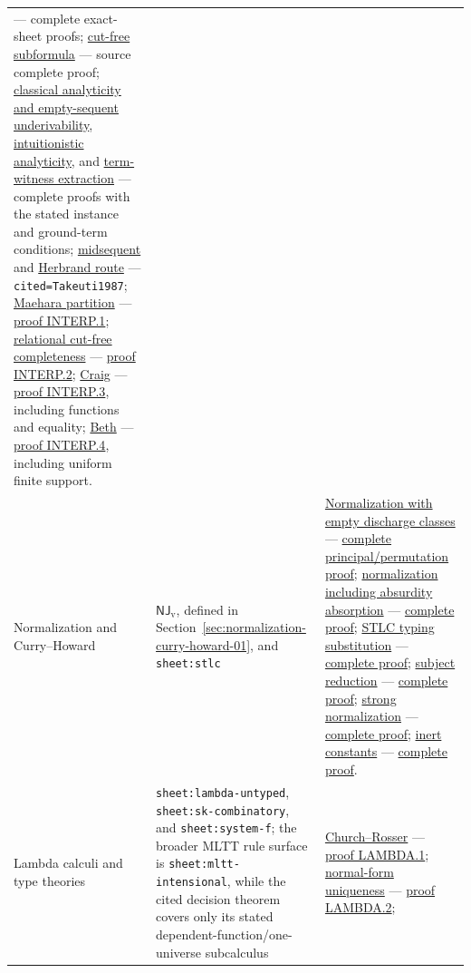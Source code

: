 \begin{landscape}
\begin{longtable}{@{}p{.82in}p{2.05in}p{4.95in}@{}}
--- complete exact-sheet proofs;
\hyperref[lem:cutfree-subformula]{cut-free subformula}
--- source complete proof;
\hyperref[thm:p07-classical-analytic]{classical analyticity and empty-sequent underivability},
\hyperref[thm:p07-lj-analyticity]{intuitionistic analyticity}, and
\hyperref[thm:p07-lj-existence-property]{term-witness extraction}
--- complete proofs with the stated instance and ground-term conditions;
\hyperref[thm:p07-midsequent]{midsequent} and
\hyperref[thm:p07-herbrand-midsequent]{Herbrand route}
--- \texttt{cited=Takeuti1987};
\hyperref[thm:p07-maehara-partition]{Maehara partition}
--- \hyperref[annex:p7.interp.1]{proof INTERP.1};
\hyperref[thm:p07-relational-cut-free-completeness]{relational cut-free completeness}
--- \hyperref[annex:p7.interp.2]{proof INTERP.2};
\hyperref[thm:craig-interpolation]{Craig}
--- \hyperref[annex:p7.interp.3]{proof INTERP.3}, including functions and equality;
\hyperref[thm:beth]{Beth}
--- \hyperref[annex:p7.interp.4]{proof INTERP.4}, including uniform finite support. \\
\addlinespace
Normalization and Curry--Howard &
\(\mathsf{NJ}_{\mathrm v}\), defined in
Section~\ref{sec:normalization-curry-howard-01}, and \texttt{sheet:stlc} &
\hyperref[sec:normalization-curry-howard-01]{Normalization with empty discharge classes}
--- \hyperref[annex:p7.nj.principal-permutation-normalization]{complete principal/permutation proof};
\hyperref[thm:p07-nj-vacuous-normalization]{normalization including absurdity absorption}
--- \hyperref[annex:p7.nj.vacuous-normalization]{complete proof};
\hyperref[thm:p07-stlc-substitution]{STLC typing substitution}
--- \hyperref[annex:p7.stlc.substitution]{complete proof};
\hyperref[thm:p07-stlc-subject-reduction]{subject reduction}
--- \hyperref[annex:p7.stlc.subject-reduction]{complete proof};
\hyperref[thm:p07-stlc-strong-normalization]{strong normalization}
--- \hyperref[annex:p7.stlc.strong-normalization]{complete proof};
\hyperref[thm:p07-stlc-inert-constants]{inert constants}
--- \hyperref[annex:p7.stlc.inert-constants]{complete proof}. \\
\addlinespace
Lambda calculi and type theories &
\texttt{sheet:lambda-untyped}, \texttt{sheet:sk-combinatory}, and
\texttt{sheet:system-f}; the broader MLTT rule surface is
\texttt{sheet:mltt-intensional}, while the cited decision theorem covers only
its stated dependent-function/one-universe subcalculus &
\hyperref[thm:p07-church-rosser]{Church--Rosser}
--- \hyperref[annex:p7.lambda.1]{proof LAMBDA.1};
\hyperref[thm:p07-beta-normal-form-unique]{normal-form uniqueness}
--- \hyperref[annex:p7.lambda.2]{proof LAMBDA.2};

\end{longtable}
\end{landscape}
